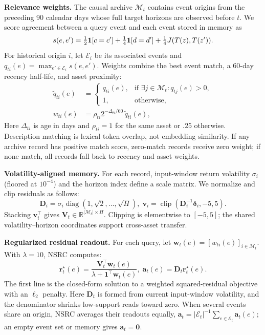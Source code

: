 \documentclass{article}
\begin{document}
\textbf{Relevance weights.} The causal archive $\mathcal M_t$ contains event origins from the preceding 90 calendar days whose full target horizons are observed before $t$. We score agreement between a query event and each event stored in memory as
\begin{equation}
 s(e,e')=\tfrac12{\bf1}[c=c']+\tfrac14{\bf1}[d=d']
       +\tfrac14J(T(z),T(z')).
\label{eq:score}
\end{equation}
For historical origin $i$, let $\mathcal E_i$ be its associated events and $q_{ti}(e)=\max_{e'\in\mathcal E_i}s(e,e')$. Weights combine the best event match, a 60-day recency half-life, and asset proximity:
\begin{equation}
\begin{aligned}
 \tilde q_{ti}(e)&=\begin{cases}
 q_{ti}(e),&\text{if }\exists j\in\mathcal M_t:q_{tj}(e)>0,\\
 1,&\text{otherwise},
 \end{cases}\\
 w_{ti}(e)&=\rho_{ti}2^{-\Delta_{ti}/60}\,\tilde q_{ti}(e),
\end{aligned}
\label{eq:weights}
\end{equation}
Here $\Delta_{ti}$ is age in days and $\rho_{ti}=1$ for the same asset or $.25$ otherwise. Description matching is lexical token overlap, not embedding similarity. If any archive record has positive match score, zero-match records receive zero weight; if none match, all records fall back to recency and asset weights.

\textbf{Volatility-aligned memory.} For each record, input-window return volatility $\sigma_i$ (floored at $10^{-4}$) and the horizon index define a scale matrix. We normalize and clip residuals as follows:
\begin{equation}
\mathbf D_i=\sigma_i\operatorname{diag}(1,\sqrt2,\ldots,\sqrt H),\;\mathbf v_i=\operatorname{clip}\left(\mathbf D_i^{-1}\boldsymbol\delta_i,-5,5\right).
\label{eq:residual}
\end{equation}
Stacking $\mathbf v_i^\top$ gives $\mathbf V_t\in\mathbb R^{|\mathcal M_t|\times H}$. Clipping is elementwise to $[-5,5]$; the shared volatility--horizon coordinates support cross-asset transfer.

\textbf{Regularized residual readout.} For each query, let $\mathbf w_t(e)=[w_{ti}(e)]_{i\in\mathcal M_t}$. With $\lambda=10$, NSRC computes:
\begin{equation}
\mathbf r_t^\star(e)=\frac{\mathbf V_t^\top\mathbf w_t(e)}{\lambda+\mathbf1^\top\mathbf w_t(e)},\;\mathbf a_t(e)=\mathbf D_t\mathbf r_t^\star(e).
\label{eq:memory}
\end{equation}
The first line is the closed-form solution to a weighted squared-residual objective with an $\ell_2$ penalty. Here $\mathbf D_t$ is formed from current input-window volatility, and the denominator shrinks low-support reads toward zero. When several events share an origin, NSRC averages their readouts equally, $\mathbf a_t=|\mathcal E_t|^{-1}\sum_{e\in\mathcal E_t}\mathbf a_t(e)$; an empty event set or memory gives $\mathbf a_t=\mathbf0$.
\end{document}
